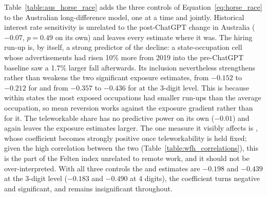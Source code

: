 \documentclass[11pt]{article}
\begin{document}
Table~\ref{table:aus_horse_race} adds the three controls of Equation~\ref{eq:horse_race} to the Australian long-difference model, one at a time and jointly. Historical interest rate sensitivity is unrelated to the post-ChatGPT change in Australia ($-0.07$, $p = 0.49$ on its own) and leaves every estimate where it was. The hiring run-up is, by itself, a strong predictor of the decline: a state-occupation cell whose advertisements had risen 10\% more from 2019 into the pre-ChatGPT baseline saw a 1.7\% larger fall afterwards. Its inclusion nevertheless strengthens rather than weakens the two significant exposure estimates, from $-0.152$ to $-0.212$ for \citet{demirev2024assessing} and from $-0.357$ to $-0.436$ for \citet{handa2025economic} at the 3-digit level. This is because within states the most exposed occupations had smaller run-ups than the average occupation, so mean reversion works against the exposure gradient rather than for it. The teleworkable share has no predictive power on its own ($-0.01$) and again leaves the exposure estimates larger. The one measure it visibly affects is \citet{felten_method_2018}, whose coefficient becomes strongly positive once teleworkability is held fixed; given the high correlation between the two (Table~\ref{table:wfh_correlations}), this is the part of the Felten index unrelated to remote work, and it should not be over-interpreted. With all three controls the \citet{demirev2024assessing} and \citet{handa2025economic} estimates are $-0.198$ and $-0.439$ at the 3-digit level ($-0.183$ and $-0.490$ at 4 digits), the \citet{eloundou_gpts_2023} coefficient turns negative and significant, and \citet{webb_impact_2022} remains insignificant throughout.
\end{document}
